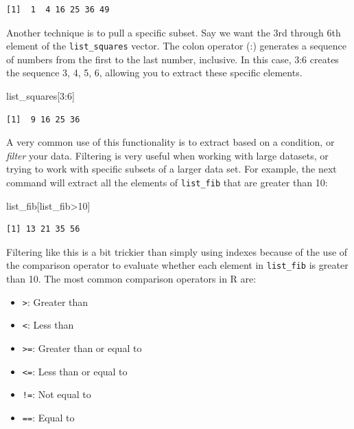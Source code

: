 \documentclass[
  letterpaper,
]{book}
\newenvironment{Shaded}{\begin{snugshade}}{\end{snugshade}}
\newcommand{\DecValTok}[1]{\textcolor[rgb]{0.68,0.00,0.00}{#1}}
\newcommand{\NormalTok}[1]{\textcolor[rgb]{0.00,0.23,0.31}{#1}}
\newcommand{\SpecialCharTok}[1]{\textcolor[rgb]{0.37,0.37,0.37}{#1}}
\providecommand{\tightlist}{%
  \setlength{\itemsep}{0pt}\setlength{\parskip}{0pt}}\usepackage{longtable,booktabs,array}
\begin{document}
\begin{verbatim}
[1]  1  4 16 25 36 49
\end{verbatim}

Another technique is to pull a specific subset. Say we want the 3rd
through 6th element of the \texttt{list\_squares} vector. The colon
operator (:) generates a sequence of numbers from the first to the last
number, inclusive. In this case, 3:6 creates the sequence 3, 4, 5, 6,
allowing you to extract these specific elements.

\begin{Shaded}
\begin{Highlighting}[]
\NormalTok{list\_squares[}\DecValTok{3}\SpecialCharTok{:}\DecValTok{6}\NormalTok{]}
\end{Highlighting}
\end{Shaded}

\begin{verbatim}
[1]  9 16 25 36
\end{verbatim}

A very common use of this functionality is to extract based on a
condition, or \emph{filter} your data. Filtering is very useful when
working with large datasets, or trying to work with specific subsets of
a larger data set. For example, the next command will extract all the
elements of \texttt{list\_fib} that are greater than 10:

\begin{Shaded}
\begin{Highlighting}[]
\NormalTok{list\_fib[list\_fib}\SpecialCharTok{\textgreater{}}\DecValTok{10}\NormalTok{]}
\end{Highlighting}
\end{Shaded}

\begin{verbatim}
[1] 13 21 35 56
\end{verbatim}

Filtering like this is a bit trickier than simply using indexes because
of the use of the comparison operator to evaluate whether each element
in \texttt{list\_fib} is greater than 10. The most common comparison
operators in R are:

\begin{itemize}
\tightlist
\item
  \texttt{\textgreater{}}: Greater than
\item
  \texttt{\textless{}}: Less than
\item
  \texttt{\textgreater{}=}: Greater than or equal to
\item
  \texttt{\textless{}=}: Less than or equal to
\item
  \texttt{!=}: Not equal to
\item
  \texttt{==}: Equal to
\end{itemize}
\end{document}

